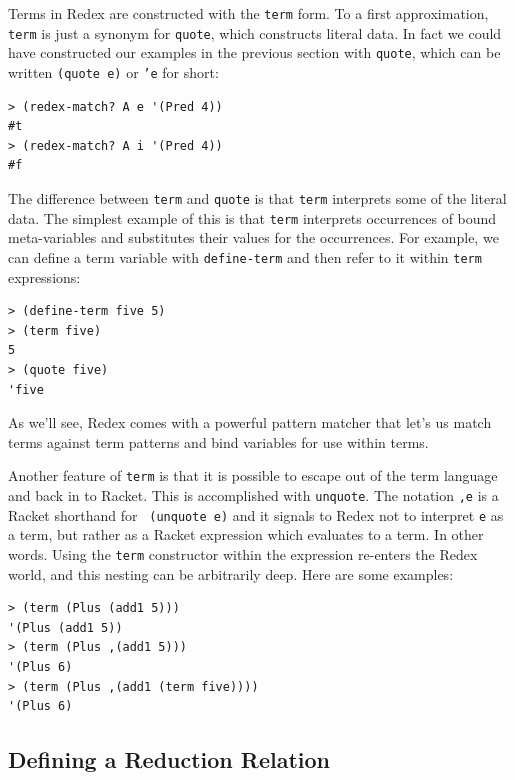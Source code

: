 Terms in Redex are constructed with the {\tt term} form.  To a first
approximation, {\tt term} is just a synonym for {\tt quote}, which
constructs literal data.  In fact we could have constructed our
examples in the previous section with {\tt quote}, which can be written
{\tt (quote e)} or {\tt 'e} for short:
\begin{verbatim}
> (redex-match? A e '(Pred 4))
#t
> (redex-match? A i '(Pred 4))
#f
\end{verbatim}

The difference between {\tt term} and {\tt quote} is that {\tt term}
interprets some of the literal data.  The simplest example of this is
that {\tt term} interprets occurrences of bound meta-variables and
substitutes their values for the occurrences.  For example, we can
define a term variable with {\tt define-term} and then refer to it
within {\tt term} expressions:
\begin{verbatim}
> (define-term five 5)
> (term five)
5
> (quote five)
'five
\end{verbatim}
As we'll see, Redex comes with a powerful pattern matcher that let's
us match terms against term patterns and bind variables for use within
terms.

Another feature of {\tt term} is that it is possible to escape out of
the term language and back in to Racket.  This is accomplished with
{\tt unquote}.  The notation {\tt ,e} is a Racket shorthand for {\tt
  (unquote e)} and it signals to Redex not to interpret {\tt e} as a
term, but rather as a Racket expression which evaluates to a term.  In
other words.  Using the {\tt term} constructor within the expression
re-enters the Redex world, and this nesting can be arbitrarily deep.
Here are some examples:
\begin{verbatim}
> (term (Plus (add1 5)))
'(Plus (add1 5))
> (term (Plus ,(add1 5)))
'(Plus 6)
> (term (Plus ,(add1 (term five))))
'(Plus 6)
\end{verbatim}


\subsection{Defining a Reduction Relation}

